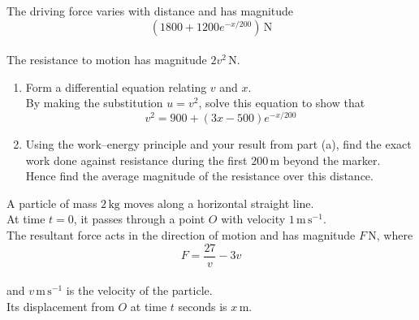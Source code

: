\documentclass[leqno]{article}
\begin{document}
\begin{enumerate}[
  label=\textbf{\arabic*.},
  leftmargin=*,
  topsep=0pt,
  partopsep=0pt,
  parsep=0pt
]
The driving force varies with distance and has magnitude
\[
\left(1800+1200e^{-x/200}\right)\,\mathrm{N}
\] \\
The resistance to motion has magnitude $2v^2\,\mathrm{N}$. \\

\begin{enumerate}[label=\textbf{(\alph*)}]
  \item Form a differential equation relating $v$ and $x$. \\
  By making the substitution $u=v^2$, solve this equation to show that
  \[
  v^2=900+(3x-500)e^{-x/200}
  \] 
  \item Using the work--energy principle and your result from part (a), find the exact work done against resistance during the first $200\,\mathrm{m}$ beyond the marker. \\
  Hence find the average magnitude of the resistance over this distance.  \\
\end{enumerate}

\newpage

\questionitem

A particle of mass $2\,\mathrm{kg}$ moves along a horizontal straight line. \\
At time $t=0$, it passes through a point $O$ with velocity $1\,\mathrm{m\,s^{-1}}$. \\
The resultant force acts in the direction of motion and has magnitude $F\,\mathrm{N}$, where
\[
F=\frac{27}{v}-3v
\] \\
and $v\,\mathrm{m\,s^{-1}}$ is the velocity of the particle. \\
Its displacement from $O$ at time $t$ seconds is $x\,\mathrm{m}$. \\


\end{enumerate}
\end{document}
